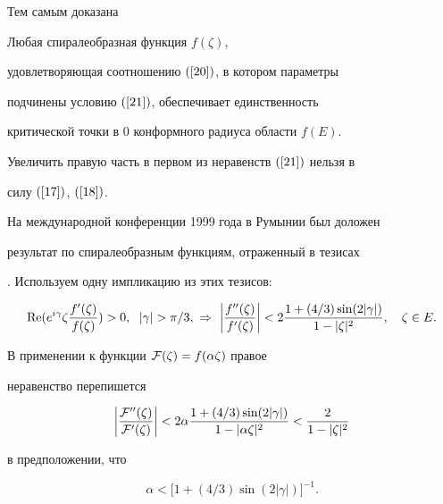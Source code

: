 Тем самым доказана





\begin{thm}


Любая спиралеобразная функция $f(\zeta)$,


удовлетворяющая соотношению $(\ref{20})$, в котором параметры


подчинены условию $(\ref{21})$, обеспечивает единственность


критической точки в $0$ конформного радиуса области $f(E)$.


Увеличить правую часть в первом из неравенств $(\ref{21})$ нельзя в


силу $(\ref{17})$, $(\ref{18})$.


\end{thm}





На международной конференции 1999 года в Румынии был доложен


результат по спиралеобразным функциям, отраженный в тезисах


\cite{9}. Используем одну импликацию из этих тезисов:


$$


\re(e^{i\gamma}\zeta\frac{f'(\zeta)}{f(\zeta)})>0,\ \;


|\gamma|>{\pi}/{3},


\ \Rightarrow 


\ \bigg|\frac{f''(\zeta)}{f'(\zeta)}\bigg|<


2\frac{1+(4/3)\sin(2|\gamma|)}{1-|\zeta|^2},\quad \zeta\in E.


$$


В применении к функции ${\cal F}(\zeta)=f(\alpha\zeta)$ правое


неравенство перепишется


$$


\bigg|\frac{{\cal F}''(\zeta)}{{\cal F}'(\zeta)}\bigg|<


2\alpha\frac{1+(4/3)\sin(2|\gamma|)}{1-|\alpha\zeta|^2}<


\frac{2}{1-|\zeta|^2}


$$


в предположении, что


\begin{equation}\label{22}


\alpha<\big[1+(4/3)\sin(2|\gamma|)\big]^{-1}.


\end{equation}


